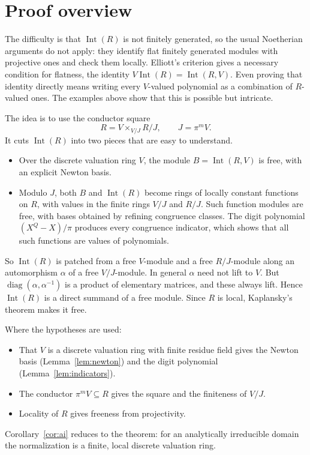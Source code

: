 \documentclass[11pt,a4paper]{article}
\theoremstyle{plain}
\theoremstyle{remark}
\newcommand{\Int}{\operatorname{Int}}
\begin{document}
\section{Proof overview}

The difficulty is that $\Int(R)$ is not finitely generated, so the usual Noetherian arguments do not apply: they
identify flat finitely generated modules with projective ones and check them locally. Elliott's criterion gives a
necessary condition for flatness, the identity $V\Int(R)=\Int(R,V)$. Even proving that identity directly means
writing every $V$-valued polynomial as a combination of $R$-valued ones. The examples above show that this is possible but
intricate.

The idea is to use the conductor square
\[
 R=V\times_{V/J}R/J,\qquad J=\pi^mV .
\]
It cuts $\Int(R)$ into two pieces that are easy to understand.
\begin{itemize}
\item Over the discrete valuation ring $V$, the module $B=\Int(R,V)$ is free, with an explicit Newton basis.
\item Modulo $J$, both $B$ and $\Int(R)$ become rings of locally constant functions on $R$, with values in the finite
rings $V/J$ and $R/J$. Such function modules are free, with bases obtained by refining congruence classes. The
digit polynomial $(X^Q-X)/\pi$ produces every congruence indicator, which shows that all such functions are values of
polynomials.
\end{itemize}
So $\Int(R)$ is patched from a free $V$-module and a free $R/J$-module along an automorphism $\alpha$ of a free
$V/J$-module. In general $\alpha$ need not lift to $V$. But $\operatorname{diag}(\alpha,\alpha^{-1})$ is a product
of elementary matrices, and these always lift. Hence $\Int(R)$ is a direct summand of a free module. Since $R$ is
local, Kaplansky's theorem makes it free.

Where the hypotheses are used:
\begin{itemize}
\item That $V$ is a discrete valuation ring with finite residue field gives the Newton basis (Lemma~\ref{lem:newton})
and the digit polynomial (Lemma~\ref{lem:indicators}).
\item The conductor $\pi^mV\subseteq R$ gives the square and the finiteness of $V/J$.
\item Locality of $R$ gives freeness from projectivity.
\end{itemize}
Corollary~\ref{cor:ai} reduces to the theorem: for an analytically irreducible domain the normalization is a finite,
local discrete valuation ring.
\end{document}
